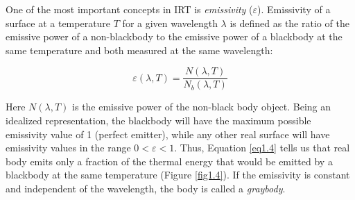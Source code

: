 		One of the most important concepts in IRT is \textit{emissivity} ($\varepsilon$). Emissivity of a surface at a temperature $T$ for a given wavelength $\lambda$ is defined as the ratio of the emissive power of a non-blackbody to the emissive power of a blackbody at the same temperature and both measured at the same wavelength:
		
		\begin{equation}\label{eq1.4}
			\varepsilon(\lambda,T)=\frac{N(\lambda,T)}{N_{b}(\lambda,T)}
		\end{equation}\bigskip
		
		Here $N(\lambda,T)$ is the emissive power of the non-black body object. Being an idealized representation, the blackbody will have the maximum possible emissivity value of 1 (perfect emitter), while any other real surface will have emissivity values in the range $0 < \varepsilon < 1$. Thus, Equation \ref{eq1.4} tells us that real body emits only a fraction of the thermal energy that would be emitted by a blackbody at the same temperature (Figure \ref{fig1.4}). If the emissivity is constant and independent of the wavelength, the body is called a \textit{graybody}.
		
